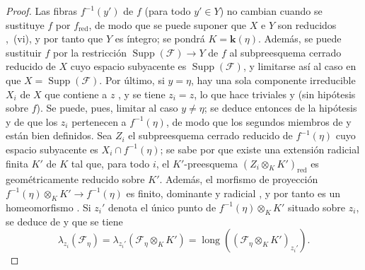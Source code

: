\begin{proof}
\label{IV.15.1.1-proof}
Las fibras $f^{-1}(y')$ de $f$ (para todo $y'\in Y$) no cambian cuando se sustituye $f$ por $f_{\mathrm{red}}$, de modo que se puede suponer que $X$ e $Y$ son reducidos ,~(vi), y por tanto que $Y$ es íntegro; se pondrá $K=\boldsymbol{k}(\eta)$.
Además, se puede sustituir $f$ por la restricción $\operatorname{Supp}(\mathcal F)\to Y$ de $f$ al subpreesquema cerrado reducido de $X$ cuyo espacio subyacente es $\operatorname{Supp}(\mathcal F)$, y limitarse así al caso en que $X=\operatorname{Supp}(\mathcal F)$.
Por último, si $y=\eta$, hay una sola componente irreducible $X_i$ de $X$ que contiene a $z$ , y se tiene $z_i=z$, lo que hace triviales  y  (sin hipótesis sobre $f$).
Se puede, pues, limitar al caso $y\ne\eta$; se deduce entonces de la hipótesis y de  que los $z_i$ pertenecen a $f^{-1}(\eta)$, de modo que los segundos miembros de  y  están bien definidos.
Sea $Z_i$ el subpreesquema cerrado reducido de $f^{-1}(\eta)$ cuyo espacio subyacente es $X_i\cap f^{-1}(\eta)$; se sabe por  que existe una extensión radicial finita $K'$ de $K$ tal que, para todo $i$, el $K'$-preesquema $(Z_i\otimes_K K')_{\mathrm{red}}$ es geométricamente reducido sobre $K'$.
Además, el morfismo de proyección $f^{-1}(\eta)\otimes_K K'\to f^{-1}(\eta)$ es finito, dominante y radicial , y por tanto es un homeomorfismo .
Si $z_i'$ denota el único punto de $f^{-1}(\eta)\otimes_K K'$ situado sobre $z_i$, se deduce de  y  que se tiene
\[
\tag{15.1.1.3}
\label{IV.15.1.1.3-fr}
  \lambda_{z_i}(\mathcal F_\eta)
  =\lambda_{z_i'}(\mathcal F_\eta\otimes_K K')
  =\operatorname{long}((\mathcal F_\eta\otimes_K K')_{z_i'}).
\]


\end{proof}
